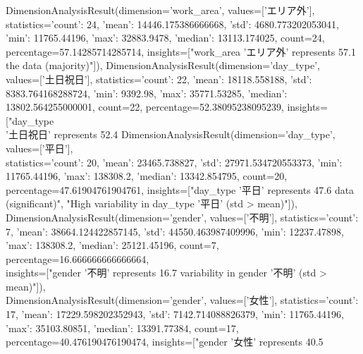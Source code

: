 \documentclass[11pt,a4paper]{article}
\begin{document}
\begin{itemize}
DimensionAnalysisResult(dimension='work\_area', values=['エリア外'],\\
statistics={'count': 24, 'mean': 14446.175386666668, 'std': 4680.773202053041,\\
'min': 11765.44196, 'max': 32883.9478, 'median': 13113.174025}, count=24,\\
percentage=57.14285714285714, insights=["work\_area 'エリア外' represents 57.1%
the data (majority)"]), DimensionAnalysisResult(dimension='day\_type',\\
values=['土日祝日'], statistics={'count': 22, 'mean': 18118.558188, 'std':\\
8383.764168288724, 'min': 9392.98, 'max': 35771.53285, 'median':\\
13802.564255000001}, count=22, percentage=52.38095238095239, insights=["day\_type\\
'土日祝日' represents 52.4%
DimensionAnalysisResult(dimension='day\_type', values=['平日'],\\
statistics={'count': 20, 'mean': 23465.738827, 'std': 27971.534720553373, 'min':\\
11765.44196, 'max': 138308.2, 'median': 13342.854795}, count=20,\\
percentage=47.61904761904761, insights=["day\_type '平日' represents 47.6%
data (significant)", "High variability in day\_type '平日' (std > mean)"]),\\
DimensionAnalysisResult(dimension='gender', values=['不明'], statistics={'count':\\
7, 'mean': 38664.124422857145, 'std': 44550.463987409996, 'min': 12237.47898,\\
'max': 138308.2, 'median': 25121.45196}, count=7, percentage=16.666666666666664,\\
insights=["gender '不明' represents 16.7%
variability in gender '不明' (std > mean)"]),\\
DimensionAnalysisResult(dimension='gender', values=['女性'], statistics={'count':\\
17, 'mean': 17229.598202352943, 'std': 7142.714088826379, 'min': 11765.44196,\\
'max': 35103.80851, 'median': 13391.77384}, count=17,\\
percentage=40.476190476190474, insights=["gender '女性' represents 40.5%

\end{itemize}
\end{document}
